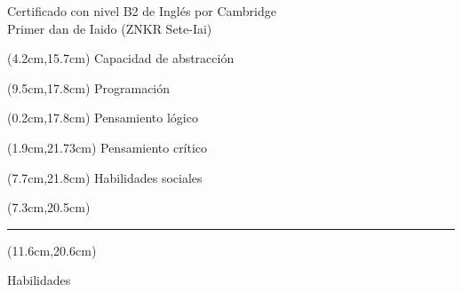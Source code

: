 \documentclass[12pt, letterpaper]{article}
\renewcommand{\normalsize}{\fontsize{13}{16}\selectfont}
\renewcommand{\small}{\fontsize{12}{14}\selectfont}
\begin{document}
\begin{minipage}[t]{0.65\textwidth}
		\vspace*{-2.5mm}
		\begin{tcolorbox}[enhanced, colback=base-color, sharp corners=all, width=0.9\textwidth, height=2.9cm, boxrule=0pt, colframe=base-color, borderline south={3pt}{0pt}{box-color}, borderline west={4pt}{0pt}{box-color}, borderline east={3pt}{0pt}{box-color}]
			\bigskip
			\normalsize
			\textcolor{text-color}{Certificado con nivel B2 de {\color{highlight-color}Inglés} por Cambridge} \smallskip\\
			\color{base2-color}  \smallskip
			\textcolor{text-color}{Primer dan de {\color{highlight-color}Iaido} (ZNKR Sete-Iai)}
		\end{tcolorbox}
		\bigskip
		\bigskip
		\begin{textblock*}{7cm}(4.2cm,15.7cm)
			\small \color{text2-color} Capacidad de abstracción
		\end{textblock*}
		\begin{textblock*}{7cm}(9.5cm,17.8cm)
			\small \color{text2-color} Programación
		\end{textblock*}
		\begin{textblock*}{7cm}(0.2cm,17.8cm)
			\small \color{text2-color} Pensamiento lógico
		\end{textblock*}
		\begin{textblock*}{7cm}(1.9cm,21.73cm)
			\small \color{text2-color} Pensamiento crítico
		\end{textblock*}
		\begin{textblock*}{7cm}(7.7cm,21.8cm)
			\small \color{text2-color} Habilidades sociales
		\end{textblock*}
		\begin{textblock*}{7cm}(7.3cm,20.5cm)
			{\bigskip \color{base2-color} \hspace{1cm} \rule{5cm}{0.1cm}}
		\end{textblock*}
		\begin{textblock*}{7cm}(11.6cm,20.6cm)
			\begin{tcolorbox}[left=1mm, right=1mm, top=1mm, bottom=1mm, colback=base2-color, boxrule=0pt, colframe=base2-color, width=3cm]
			\textcolor{base-color}{\large Habilidades}
			\end{tcolorbox}
		\end{textblock*}
		\hspace*{-1.4cm}
		\centering \resizebox{0.6\textwidth}{!}{}
	\end{minipage}
\end{document}

